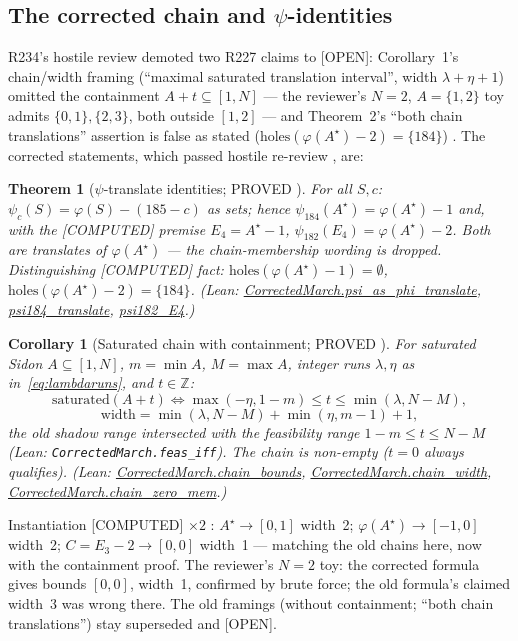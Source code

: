 \documentclass[11pt,a4paper]{article}
\newtheorem{theorem}{Theorem}
\newtheorem{corollary}{Corollary}
\theoremstyle{definition}
\begin{document}
\subsection{The corrected chain and $\psi$-identities}
\label{sec:chain}

R234's hostile review demoted two R227 claims to [OPEN]:
Corollary~1's chain/width framing (``maximal saturated translation
interval'', width $\lambda+\eta+1$) omitted the containment
$A+t\subseteq[1,N]$ --- the reviewer's $N=2$, $A=\{1,2\}$ toy admits
$\{0,1\},\{2,3\}$, both outside $[1,2]$ --- and Theorem~2's ``both
chain translations'' assertion is false as stated
($\mathrm{holes}(\varphi(A^\star)-2)=\{184\}$)
\cite{D234,D235}. The corrected statements, which passed hostile
re-review \cite{D238}, are:

\begin{theorem}[$\psi$-translate identities; PROVED \cite{D246}]
  \label{thm:psi}
  For all $S,c$: $\psi_c(S)=\varphi(S)-(185-c)$ as sets; hence
  $\psi_{184}(A^\star)=\varphi(A^\star)-1$ and, with the [COMPUTED]
  premise $E_4=A^\star-1$, $\psi_{182}(E_4)=\varphi(A^\star)-2$.
  Both are translates of $\varphi(A^\star)$ --- the chain-membership
  wording is dropped. Distinguishing [COMPUTED] fact:
  $\mathrm{holes}(\varphi(A^\star)-1)=\emptyset$,
  $\mathrm{holes}(\varphi(A^\star)-2)=\{184\}$.
  (Lean: \url{CorrectedMarch.psi_as_phi_translate},
  \url{psi184_translate}, \url{psi182_E4}.)
\end{theorem}

\begin{corollary}[Saturated chain with containment; PROVED \cite{D246}]
  \label{cor:chain}
  For saturated Sidon $A\subseteq[1,N]$, $m=\min A$, $M=\max A$,
  integer runs $\lambda,\eta$ as in~\eqref{eq:lambdaruns}, and
  $t\in\mathbb{Z}$:
  \begin{equation}
    \label{eq:chainbounds}
    \text{saturated}(A+t)\iff
      \max(-\eta,1-m)\le t\le\min(\lambda,N-M),
  \end{equation}
  \begin{equation}
    \label{eq:chainwidth}
    \text{width}=\min(\lambda,N-M)+\min(\eta,m-1)+1,
  \end{equation}
  the old shadow range intersected with the feasibility range
  $1-m\le t\le N-M$ (Lean: \texttt{CorrectedMarch.feas\_iff}).
  The chain is non-empty ($t=0$ always qualifies).
  (Lean: \url{CorrectedMarch.chain_bounds},
  \url{CorrectedMarch.chain_width},
  \url{CorrectedMarch.chain_zero_mem}.)
\end{corollary}
\noindent Instantiation [COMPUTED] $\times2$ \cite{D235}:
$A^\star\to[0,1]$ width~2; $\varphi(A^\star)\to[-1,0]$ width~2;
$C=E_3-2\to[0,0]$ width~1 --- matching the old chains here, now with
the containment proof. The reviewer's $N=2$ toy: the corrected formula
gives bounds $[0,0]$, width~1, confirmed by brute force; the old
formula's claimed width~3 was wrong there. The old framings (without
containment; ``both chain translations'') stay superseded and [OPEN].
\end{document}
